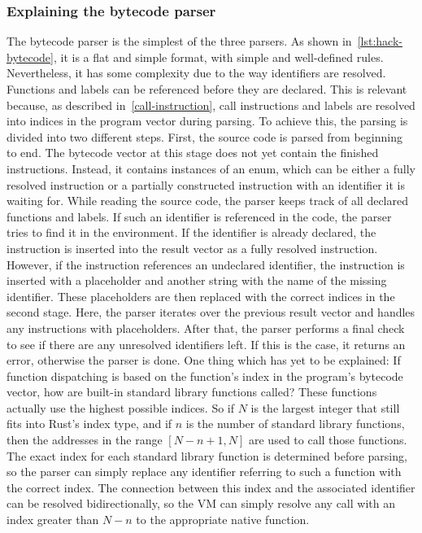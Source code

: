 \subsubsection{Explaining the bytecode parser} \label{bytecode-parser}
The bytecode parser is the simplest of the three parsers. As shown in~\cref{lst:hack-bytecode}, it is a flat and simple format, with simple and well-defined rules. Nevertheless, it has some complexity due to the way identifiers are resolved. Functions and labels can be referenced before they are declared. This is relevant because, as described in~\cref{call-instruction}, call instructions and labels are resolved into indices in the program vector during parsing.
To achieve this, the parsing is divided into two different steps.
First, the source code is parsed from beginning to end. The bytecode vector at this stage does not yet contain the finished instructions.
Instead, it contains instances of an enum, which can be either a fully resolved instruction or a partially constructed instruction with an identifier it is waiting for. While reading the source code, the parser keeps track of all declared functions and labels.
If such an identifier is referenced in the code, the parser tries to find it in the environment. If the identifier is already declared, the instruction is inserted into the result vector as a fully resolved instruction. However, if the instruction references an undeclared identifier, the instruction is inserted with a placeholder and another string with the name of the missing identifier.
These placeholders are then replaced with the correct indices in the second stage. Here, the parser iterates over the previous result vector and handles any instructions with placeholders.
After that, the parser performs a final check to see if there are any unresolved identifiers left. If this is the case, it returns an error, otherwise the parser is done.
One thing which has yet to be explained: If function dispatching is based on the function's index in the program's bytecode vector, how are built-in standard library functions called?
These functions actually use the highest possible indices. So if \(N\) is the largest integer that still fits into Rust's index type, and if \(n\) is the number of standard library functions, then the addresses in the range \([N - n + 1, N]\) are used to call those functions.
The exact index for each standard library function is determined before parsing, so the parser can simply replace any identifier referring to such a function with the correct index.
The connection between this index and the associated identifier can be resolved bidirectionally, so the VM can simply resolve any call with an index greater than \(N - n\) to the appropriate native function.

